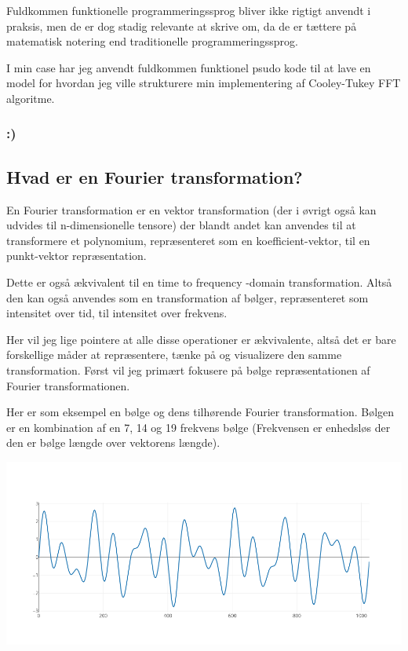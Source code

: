 \documentclass[11pt,a4paper]{article}
\begin{document}
Fuldkommen funktionelle programmeringssprog bliver ikke rigtigt anvendt i praksis,
men de er dog stadig relevante at skrive om, da de er tættere på matematisk notering
end traditionelle programmeringssprog.

I min case har jeg anvendt fuldkommen funktionel psudo kode til at lave en model
for hvordan jeg ville strukturere min implementering af Cooley-Tukey FFT algoritme.

\subsubsection{:)}
\label{sec:org549e76a}
\newpage

\subsection{Hvad er en Fourier transformation?}
\label{sec:org95f2b98}

En Fourier transformation er en vektor transformation (der i øvrigt også kan udvides til n-dimensionelle tensore)
der blandt andet kan anvendes til at transformere et polynomium,
repræsenteret som en koefficient-vektor, til en punkt-vektor repræsentation.

Dette er også ækvivalent til en time to frequency -domain transformation.
Altså den kan også anvendes som en transformation af bølger, repræsenteret som intensitet over tid, til intensitet over frekvens.

Her vil jeg lige pointere at alle disse operationer er ækvivalente, altså det er bare forskellige måder at repræsentere, tænke på og visualizere den samme transformation.
Først vil jeg primært fokusere på bølge repræsentationen af Fourier transformationen.

\bigskip

Her er som eksempel en bølge og dens tilhørende Fourier transformation.
Bølgen er en kombination af en 7, 14 og 19 frekvens bølge (Frekvensen er enhedsløs der den er bølge længde over vektorens længde).

\begin{center}
\includegraphics[width=.9\linewidth]{./source_plot2.png}
\end{center}
\end{document}
